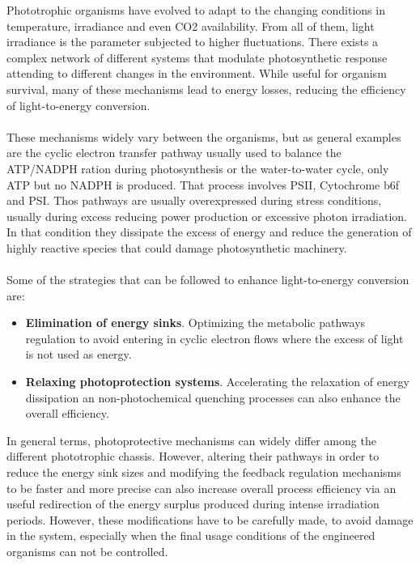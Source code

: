 Phototrophic organisms have evolved to adapt to the changing conditions in temperature, irradiance and even CO2 availability. From all of them, light irradiance is the parameter subjected to higher fluctuations. There exists a complex network of different systems that modulate photosynthetic response attending to different changes in the environment. While useful for organism survival, many of these mechanisms lead to energy losses, reducing the efficiency of light-to-energy conversion.\\ \\
These mechanisms widely vary between the organisms, but as general examples are the cyclic electron transfer pathway usually used to balance the ATP/NADPH ration during photosynthesis or the water-to-water cycle, only ATP but no NADPH is produced. That process involves PSII, Cytochrome b6f and PSI. Thos pathways are usually overexpressed during stress conditions, usually during excess reducing power production or excessive photon irradiation. In that condition they dissipate the excess of energy and reduce the generation of highly reactive species that could damage photosynthetic machinery. \\ \\
Some of the strategies that can be followed to enhance light-to-energy conversion are:
\begin{itemize}
    \item[] \textbf{Elimination of energy sinks}. Optimizing the metabolic pathways regulation to avoid entering in cyclic electron flows where the excess of light is not used as energy.
    \item[] \textbf{Relaxing photoprotection systems}. Accelerating the relaxation of energy dissipation an non-photochemical quenching processes can also enhance the overall efficiency.
\end{itemize} 
In general terms, photoprotective mechanisms can widely differ among the different phototrophic chassis. However, altering their pathways in order to reduce the energy sink sizes and modifying the feedback regulation mechanisms to be faster and more precise can also increase overall process efficiency via an useful redirection of the energy surplus produced during intense irradiation periods.  However, these modifications have to be carefully made, to avoid damage in the system, especially when the final usage conditions of the engineered organisms can not be controlled.
 
